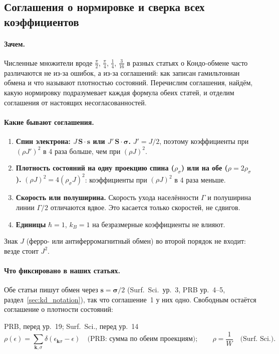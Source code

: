 
\subsection{Соглашения о нормировке и сверка всех коэффициентов}
\label{sec:kd_conv}

\paragraph{Зачем.} Численные множители вроде $\tfrac\pi2$, $\tfrac\pi4$, $\tfrac14$, $\tfrac3{16}$ в
разных статьях о Кондо-обмене часто различаются не из-за ошибок, а из-за
соглашений: как записан гамильтониан обмена и что называют плотностью
состояний. Перечислим соглашения, найдём, какую нормировку подразумевает
каждая формула обеих статей, и отделим соглашения от настоящих
несогласованностей.

\paragraph{Какие бывают соглашения.}
\begin{enumerate}
\item \textbf{Спин электрона: $J\,\mathbf S\cdot\mathbf s$ или $J'\,\mathbf S\cdot\boldsymbol\sigma$.} $J'=J/2$, поэтому
  коэффициенты при $(\rho J')^2$ в 4 раза больше, чем при $(\rho J)^2$.
\item \textbf{Плотность состояний на одну проекцию спина ($\rho_\sigma$) или на обе
  ($\rho=2\rho_\sigma$).} $(\rho J)^2=4(\rho_\sigma J)^2$: коэффициенты при $(\rho J)^2$ в 4 раза
  меньше.
\item \textbf{Скорость или полуширина.} Скорость ухода населённости $\Gamma$ и
  полуширина линии $\Gamma/2$ отличаются вдвое. Это касается только скоростей, не
  сдвигов.
\item \textbf{Единицы} $\hbar=1$, $k_B=1$ на безразмерные коэффициенты не влияют.
\end{enumerate}
Знак $J$ (ферро- или антиферромагнитный обмен) во второй порядок не входит:
везде стоит $J^2$.

\paragraph{Что фиксировано в наших статьях.} Обе статьи пишут обмен через
$\mathbf s=\boldsymbol\sigma/2$ (Surf.\ Sci.\ ур.~3, PRB ур.~4--5, раздел~\ref{sec:kd_notation}), так что
соглашение~1 у них одно. Свободным остаётся соглашение о плотности
состояний:
\begin{paperbox}{PRB, перед ур.~19; Surf.\ Sci., перед ур.~14}
\[
\rho(\epsilon)=\sum_{\mathbf k,\sigma}\delta(\epsilon_{\mathbf k\sigma}-\epsilon)\quad\text{(PRB: сумма по обеим проекциям)};
\qquad \rho=\frac1W\quad\text{(Surf.\ Sci.)}.
\]
\end{paperbox}

